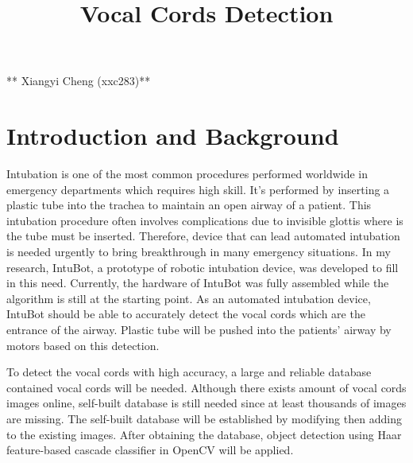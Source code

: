 \documentclass[11pt]{article}
\title{Vocal Cords Detection}
\begin{document}
    
    
    \maketitle
    
    

    
    ** Xiangyi Cheng (xxc283)**

    \hypertarget{introduction-and-background}{%
\section{Introduction and
Background}\label{introduction-and-background}}

    Intubation is one of the most common procedures performed worldwide in
emergency departments which requires high skill. It's performed by
inserting a plastic tube into the trachea to maintain an open airway of
a patient. This intubation procedure often involves complications due to
invisible glottis where is the tube must be inserted. Therefore, device
that can lead automated intubation is needed urgently to bring
breakthrough in many emergency situations. In my research, IntuBot, a
prototype of robotic intubation device, was developed to fill in this
need. Currently, the hardware of IntuBot was fully assembled while the
algorithm is still at the starting point. As an automated intubation
device, IntuBot should be able to accurately detect the vocal cords
which are the entrance of the airway. Plastic tube will be pushed into
the patients' airway by motors based on this detection.

To detect the vocal cords with high accuracy, a large and reliable
database contained vocal cords will be needed. Although there exists
amount of vocal cords images online, self-built database is still needed
since at least thousands of images are missing. The self-built database
will be established by modifying then adding to the existing images.
After obtaining the database, object detection using Haar feature-based
cascade classifier in OpenCV will be applied.
\end{document}
